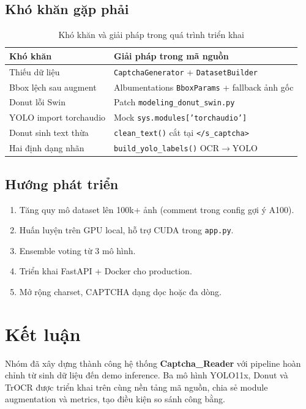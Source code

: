 \documentclass[a4paper,12pt]{report}
\begin{document}
\section{Khó khăn gặp phải}
\begin{table}[H]
  \centering
  \caption{Khó khăn và giải pháp trong quá trình triển khai}
  \begin{tabular}{p{4.5cm}p{8.5cm}}
    \toprule
    \textbf{Khó khăn} & \textbf{Giải pháp trong mã nguồn} \\
    \midrule
    Thiếu dữ liệu & \texttt{CaptchaGenerator} + \texttt{DatasetBuilder} \\
    Bbox lệch sau augment & Albumentations \texttt{BboxParams} + fallback ảnh gốc \\
    Donut lỗi Swin & Patch \texttt{modeling\_donut\_swin.py} \\
    YOLO import torchaudio & Mock \texttt{sys.modules['torchaudio']} \\
    Donut sinh text thừa & \texttt{clean\_text()} cắt tại \texttt{</s\_captcha>} \\
    Hai định dạng nhãn & \texttt{build\_yolo\_labels()} OCR$\rightarrow$YOLO \\
    \bottomrule
  \end{tabular}
\end{table}

\section{Hướng phát triển}
\begin{enumerate}[leftmargin=*]
  \item Tăng quy mô dataset lên 100k+ ảnh (comment trong config gợi ý A100).
  \item Huấn luyện trên GPU local, hỗ trợ CUDA trong \texttt{app.py}.
  \item Ensemble voting từ 3 mô hình.
  \item Triển khai FastAPI + Docker cho production.
  \item Mở rộng charset, CAPTCHA dạng dọc hoặc đa dòng.
\end{enumerate}

\chapter*{Kết luận}

Nhóm đã xây dựng thành công hệ thống \textbf{Captcha\_Reader} với pipeline hoàn chỉnh từ sinh dữ liệu đến demo inference. Ba mô hình YOLO11x, Donut và TrOCR được triển khai trên cùng nền tảng mã nguồn, chia sẻ module augmentation và metrics, tạo điều kiện so sánh công bằng.
\end{document}
